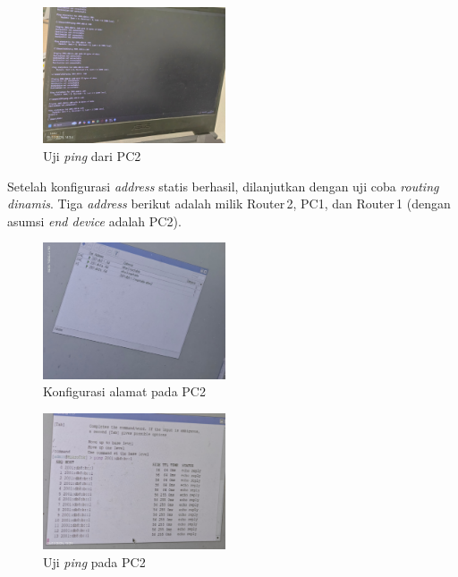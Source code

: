 \begin{figure}[H]
    \centering
    \includegraphics[width=0.48\textwidth]{img/A2-2.jpeg}
    \caption{Uji \textit{ping} dari PC2}
    \label{fig:a2b}
\end{figure}

\newpage

Setelah konfigurasi \textit{address} statis berhasil, dilanjutkan dengan uji coba \textit{routing dinamis}. Tiga \textit{address} berikut adalah milik Router\,2, PC1, dan Router\,1 (dengan asumsi \textit{end device} adalah PC2).

\begin{figure}[H]
    \centering
    \includegraphics[width=0.48\textwidth]{img/A4.jpg}
    \caption{Konfigurasi alamat pada PC2}
    \label{fig:a4}
\end{figure}

\begin{figure}[H]
    \centering
    \includegraphics[width=0.48\textwidth]{img/A5.jpeg}
    \caption{Uji \textit{ping} pada PC2}
    \label{fig:a5}
\end{figure}

